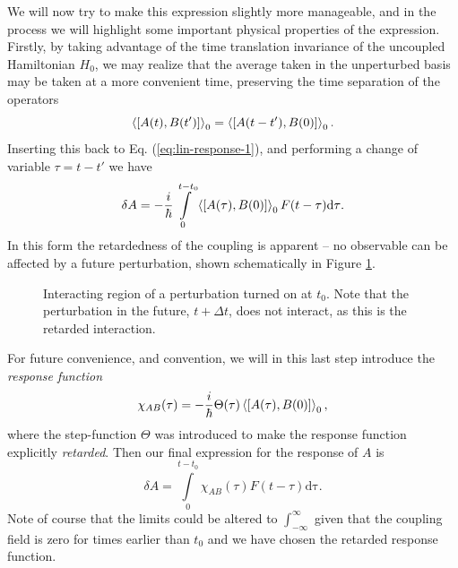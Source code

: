 We will now try to make this expression slightly more manageable, and in the process we will highlight some important physical properties of the expression.
Firstly, by taking advantage of the time translation invariance of the uncoupled Hamiltonian $H_0$, we may realize that the average taken in the unperturbed basis may be taken at a more convenient time, preserving the time separation of the operators
\begin{equation}
  \Braket{\left[
      {A}(t), {B}(t')
    \right]}_0
=
\Braket{\left[
    {A}(t-t'), {B}(0)
    \right]}_0.
\end{equation}
Inserting this back to Eq. (\ref{eq:lin-response-1}), and performing a change of variable $\tau = t  - t'$ we have
\begin{equation}
\label{eq:13}
\delta {A} = -\frac{i}{\hbar} \int\limits_{0}^{t-t_0}
\Braket{\left[
    {A}(\tau), {B}(0)
  \right]}_{0}
F(t - \tau) \mathrm{d\tau}.
\end{equation}
In this form the retardedness of the coupling is apparent -- no observable can be affected by a future perturbation, shown schematically in Figure \ref{fig:interaction}.

\begin{figure}[ht]
  \centering
  \caption{Interacting region of a perturbation turned on at $t_0$. Note that the perturbation in the future, $t+\Delta t$, does not interact, as this is the retarded interaction.}
  \label{fig:interaction}
\end{figure}
For future convenience, and convention, we will in this last step introduce the \emph{response function}
\begin{equation}
\label{eq:14}
\chi_{AB}(\tau) = -\frac{i}{\hbar} \Theta(\tau)
\Braket{\left[
{A}(\tau), {B}(0)
  \right]}_0,
\end{equation}
where the step-function $\Theta$ was introduced to make the response function explicitly \emph{retarded}.
Then our final expression for the response of ${A}$ is
\begin{equation}
  \label{eq:linearResponse}
\delta {A} = \int\limits_{0}^{t-t_0}
\chi_{AB}(\tau) F(t - \tau) \mathrm{d\tau}.
\end{equation}
Note of course that the limits could be altered to $\int_{-\infty}^{\infty}$ given that the coupling field is zero for times earlier than $t_0$ and we have chosen the retarded response function.

